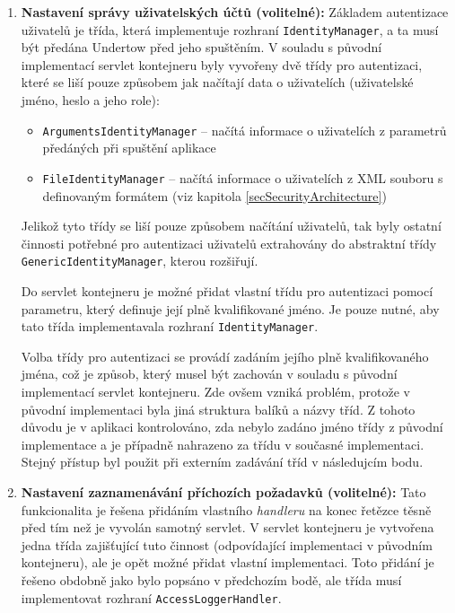 \begin{enumerate}
                \item \textbf{Nastavení správy uživatelských účtů (volitelné):} Základem autentizace
                    uživatelů je třída, která implementuje rozhraní \texttt{IdentityManager}, a ta musí
                    být předána Undertow před jeho spuštěním. 
                    V souladu s původní implementací servlet kontejneru byly vyvořeny dvě třídy pro autentizaci, které
                    se liší pouze způsobem jak načítají data o uživatelích (uživatelské jméno, heslo a jeho role):
                    \begin{itemize}
                        \item \texttt{ArgumentsIdentityManager} -- načítá informace o uživatelích z parametrů předáných
                            při spuštění aplikace
                        \item \texttt{FileIdentityManager} -- načítá informace o uživatelích z XML souboru s definovaným formátem 
                            (viz kapitola \ref{secSecurityArchitecture})
                    \end{itemize}

                    Jelikož tyto třídy se liší pouze způsobem načítání uživatelů, tak byly ostatní činnosti potřebné pro
                    autentizaci uživatelů extrahovány 
                    do abstraktní třídy \\\texttt{GenericIdentityManager}, kterou rozšiřují.
                        
                    Do servlet kontejneru je možné přidat vlastní třídu pro autentizaci pomocí parametru,
                    který definuje její plně kvalifikované jméno. Je pouze nutné, aby tato třída implementavala
                    rozhraní \texttt{IdentityManager}.

                    Volba třídy pro autentizaci se provádí zadáním jejího plně kvalifikovaného jména, což
                    je způsob, který musel být zachován v souladu s původní implementací servlet kontejneru. 
                    Zde ovšem vzniká problém, protože v původní implementaci byla jiná struktura balíků
                    a názvy tříd. Z tohoto důvodu je v aplikaci kontrolováno, zda nebylo zadáno
                    jméno třídy z původní implementace a je případně nahrazeno za třídu v současné implementaci.
                    Stejný přístup byl použit při externím zadávání tříd v následujcím bodu.
                
                \item \textbf{Nastavení zaznamenávání příchozích požadavků (volitelné):}
                     Tato funkcionalita je řešena přidáním vlastního \emph{handleru} na konec řetězce 
                     těsně před tím než je vyvolán samotný servlet. V servlet kontejneru je 
                     vytvořena jedna třída zajišťující tuto činnost (odpovídající implementaci v původním
                     kontejneru), ale je opět možné přidat vlastní implementaci. Toto přidání
                     je řešeno obdobně jako bylo popsáno v předchozím bodě, ale
                     třída musí implementovat rozhraní \texttt{AccessLoggerHandler}.
                     

\end{enumerate}
